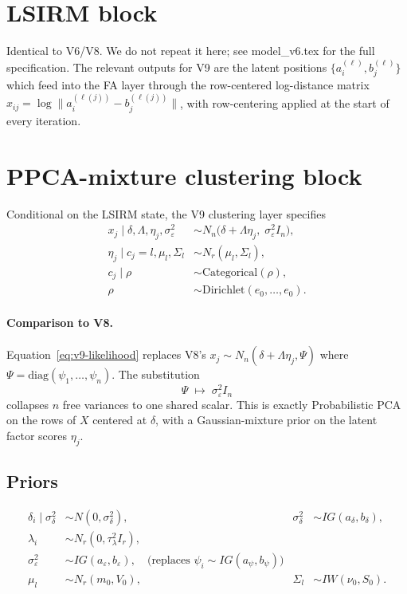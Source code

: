 \documentclass[11pt]{article}
\begin{document}
\section{LSIRM block}

Identical to V6/V8. We do not repeat it here; see model\_v6.tex for the full specification.
The relevant outputs for V9 are the latent positions $\{a_i^{(\ell)}, b_j^{(\ell)}\}$
which feed into the FA layer through the row-centered log-distance matrix
$x_{ij}=\log\|a_i^{(\ell(j))}-b_j^{(\ell(j))}\|$, with row-centering applied
at the start of every iteration.

\section{PPCA-mixture clustering block}

Conditional on the LSIRM state, the V9 clustering layer specifies
\begin{align}
x_j \mid \delta,\Lambda,\eta_j,\sigma_\varepsilon^2
&\sim N_n\bigl(\delta+\Lambda\eta_j,\;\sigma_\varepsilon^2 I_n\bigr),\label{eq:v9-likelihood}\\
\eta_j \mid c_j=l,\mu_l,\Sigma_l &\sim N_r(\mu_l,\Sigma_l),\\
c_j \mid \rho &\sim \mathrm{Categorical}(\rho),\\
\rho &\sim \mathrm{Dirichlet}(e_0,\dots,e_0).
\end{align}

\paragraph{Comparison to V8.}
Equation~\eqref{eq:v9-likelihood} replaces V8's
$x_j \sim N_n(\delta+\Lambda\eta_j,\Psi)$
where $\Psi=\mathrm{diag}(\psi_1,\dots,\psi_n)$.
The substitution
\[
\Psi \;\longmapsto\; \sigma_\varepsilon^2 I_n
\]
collapses $n$ free variances to one shared scalar.
This is exactly Probabilistic PCA on the rows of $X$ centered at $\delta$,
with a Gaussian-mixture prior on the latent factor scores $\eta_j$.

\subsection{Priors}

\begin{align}
\delta_i\mid\sigma_\delta^2 &\sim N(0,\sigma_\delta^2), &
\sigma_\delta^2 &\sim IG(a_\delta,b_\delta),\\
\lambda_i &\sim N_r(0,\tau_\lambda^2 I_r),\\
\sigma_\varepsilon^2 &\sim IG(a_\varepsilon,b_\varepsilon),\quad\text{(replaces }\psi_i\sim IG(a_\psi,b_\psi)\text{)}\\
\mu_l &\sim N_r(m_0,V_0), &
\Sigma_l &\sim IW(\nu_0,S_0).
\end{align}
\end{document}
